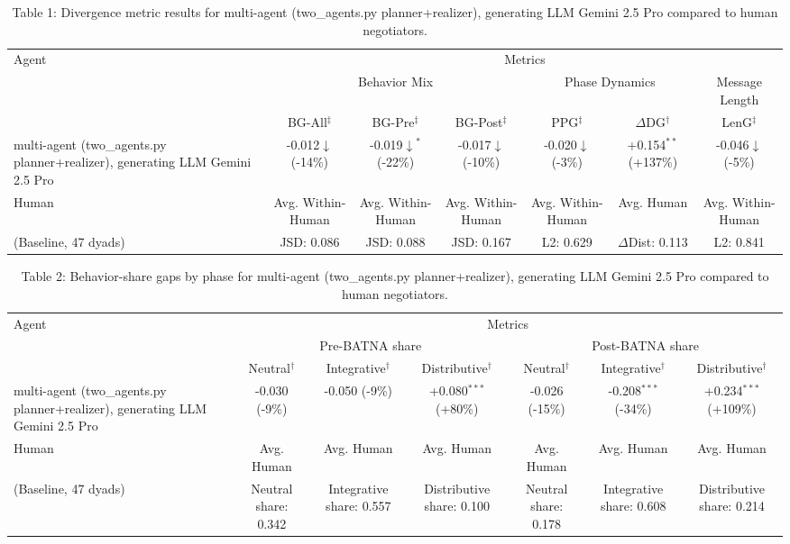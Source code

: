 \begin{table}[t]
\centering
\begin{tabular}{lcccccc}
\toprule
\multirow{3}{*}{Agent} & \multicolumn{6}{c}{Metrics} \\
\cmidrule(lr){2-7}
 & \multicolumn{3}{c}{Behavior Mix} & \multicolumn{2}{c}{Phase Dynamics} & \multicolumn{1}{c}{Message Length} \\
\cmidrule(lr){2-4} \cmidrule(lr){5-6} \cmidrule(lr){7-7}
 & BG-All$^\ddagger$ & BG-Pre$^\ddagger$ & BG-Post$^\ddagger$ & PPG$^\ddagger$ & $\Delta$DG$^\dagger$ & LenG$^\ddagger$ \\
\midrule
multi-agent (two_agents.py planner+realizer), generating LLM Gemini 2.5 Pro & -0.012$\downarrow$ (-14\%) & -0.019$\downarrow$$^{*}$ (-22\%) & -0.017$\downarrow$ (-10\%) & -0.020$\downarrow$ (-3\%) & +0.154$^{**}$ (+137\%) & -0.046$\downarrow$ (-5\%) \\
\midrule
Human & Avg. Within-Human & Avg. Within-Human & Avg. Within-Human & Avg. Within-Human & Avg. Human & Avg. Within-Human \\
(Baseline, 47 dyads) & JSD: 0.086 & JSD: 0.088 & JSD: 0.167 & L2: 0.629 & $\Delta$Dist: 0.113 & L2: 0.841 \\
\bottomrule
\end{tabular}
\caption{Table 1: Divergence metric results for multi-agent (two_agents.py planner+realizer), generating LLM Gemini 2.5 Pro compared to human negotiators.}
\end{table}

\begin{table}[t]
\centering
\begin{tabular}{lcccccc}
\toprule
\multirow{3}{*}{Agent} & \multicolumn{6}{c}{Metrics} \\
\cmidrule(lr){2-7}
 & \multicolumn{3}{c}{Pre-BATNA share} & \multicolumn{3}{c}{Post-BATNA share} \\
\cmidrule(lr){2-4} \cmidrule(lr){5-7}
 & Neutral$^\dagger$ & Integrative$^\dagger$ & Distributive$^\dagger$ & Neutral$^\dagger$ & Integrative$^\dagger$ & Distributive$^\dagger$ \\
\midrule
multi-agent (two_agents.py planner+realizer), generating LLM Gemini 2.5 Pro & -0.030 (-9\%) & -0.050 (-9\%) & +0.080$^{***}$ (+80\%) & -0.026 (-15\%) & -0.208$^{***}$ (-34\%) & +0.234$^{***}$ (+109\%) \\
\midrule
Human & Avg. Human & Avg. Human & Avg. Human & Avg. Human & Avg. Human & Avg. Human \\
(Baseline, 47 dyads) & Neutral share: 0.342 & Integrative share: 0.557 & Distributive share: 0.100 & Neutral share: 0.178 & Integrative share: 0.608 & Distributive share: 0.214 \\
\bottomrule
\end{tabular}
\caption{Table 2: Behavior-share gaps by phase for multi-agent (two_agents.py planner+realizer), generating LLM Gemini 2.5 Pro compared to human negotiators.}
\end{table}
